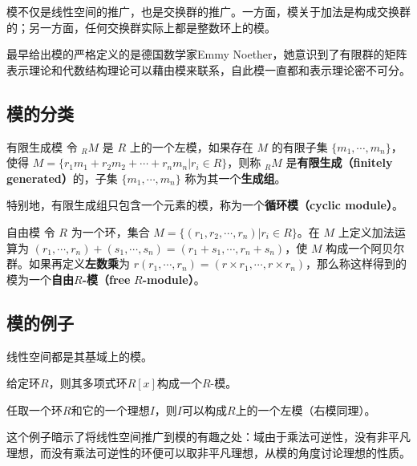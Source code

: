 模不仅是线性空间的推广，也是交换群的推广。一方面，模关于加法是构成交换群的；另一方面，任何交换群实际上都是整数环上的模。


最早给出模的严格定义的是德国数学家Emmy Noether，她意识到了有限群的矩阵表示理论和代数结构理论可以藉由模来联系，自此模一直都和表示理论密不可分。



\subsection{模的分类}

\begin{definition}{有限生成模}
令 $_RM$ 是 $R$ 上的一个左模，如果存在 $M$ 的有限子集 $\{m_1, \cdots, m_n\}$，使得 $M=\{r_1m_1+r_2m_2+\cdots+r_nm_n|r_i\in R\}$，则称 $_RM$ 是\textbf{有限生成（finitely generated）}的，子集 $\{m_1, \cdots, m_n\}$ 称为其一个\textbf{生成组}。

特别地，有限生成组只包含一个元素的模，称为一个\textbf{循环模（cyclic module）}。
\end{definition}


\begin{definition}{自由模}
令 $R$ 为一个环，集合 $M=\{(r_1, r_2, \cdots, r_n)|r_i\in R\}$。在 $M$ 上定义加法运算为 $(r_1, \cdots, r_n)+(s_1, \cdots, s_n)=(r_1+s_1, \cdots, r_n+s_n)$，使 $M$ 构成一个阿贝尔群。如果再定义\textbf{左数乘}为 $r(r_1, \cdots, r_n)=(r\times r_1, \cdots, r\times r_n)$，那么称这样得到的模为一个\textbf{自由}$R$\textbf{-模（free} $R$\textbf{-module）}。
\end{definition}





\subsection{模的例子}

\begin{example}{}
线性空间都是其基域上的模。
\end{example}

\begin{example}{}
给定环$R$，则其多项式环$R[x]$构成一个$R$-模。
\end{example}



\begin{example}{}

任取一个环$R$和它的一个理想$I$，则$I$可以构成$R$上的一个左模（右模同理）。

这个例子暗示了将线性空间推广到模的有趣之处：域由于乘法可逆性，没有非平凡理想，而没有乘法可逆性的环便可以取非平凡理想，从模的角度讨论理想的性质。

\end{example}


